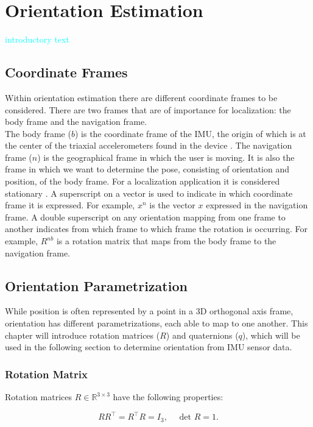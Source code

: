 \section{Orientation Estimation}
\textcolor{cyan}{introductory text}
\subsection{Coordinate Frames}
Within orientation estimation there are  different coordinate frames to be considered. There are two frames that are of importance for localization: the body frame and the navigation frame.\\
The body frame ($b$) is the coordinate frame of the IMU, the origin of which is at the center of the triaxial accelerometers found in the device \cite{Kok2017}. The navigation frame ($n$) is the geographical frame in which the user is moving. It is also the frame in which we want to determine the pose, consisting of orientation and position, of the body frame. For a localization application it is considered stationary \cite{Kok2017}.
A superscript on a vector is used to indicate in which coordinate frame it is expressed. For example,
$x^n$ is the vector $x$ expressed in the navigation frame. A double superscript on any orientation mapping from one frame to another indicates from which frame to which frame the rotation is occurring. For example,
$R^{nb}$ is a rotation matrix that maps from the body frame to the navigation frame.


\subsection{Orientation Parametrization}
While position is often represented by a point in a 3D orthogonal axis frame, orientation has different parametrizations, each able to map to one another. This chapter will introduce rotation matrices ($R$) and quaternions ($q$), which will be used in the following section to determine orientation from IMU sensor data.

\subsubsection{Rotation Matrix}
Rotation matrices $R \in \mathbb{R}^{3 \times 3}$ have the following properties:

\begin{equation}
	\label{eq:rot_mat_properties}
	R R^{\top}=R^{\top} R=I_{3}, \quad \text { det } R=1.
\end{equation}

